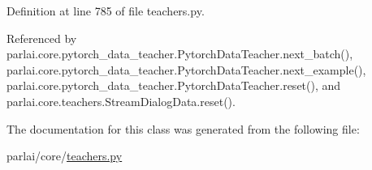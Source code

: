 Definition at line 785 of file teachers.\+py.



Referenced by parlai.\+core.\+pytorch\+\_\+data\+\_\+teacher.\+Pytorch\+Data\+Teacher.\+next\+\_\+batch(), parlai.\+core.\+pytorch\+\_\+data\+\_\+teacher.\+Pytorch\+Data\+Teacher.\+next\+\_\+example(), parlai.\+core.\+pytorch\+\_\+data\+\_\+teacher.\+Pytorch\+Data\+Teacher.\+reset(), and parlai.\+core.\+teachers.\+Stream\+Dialog\+Data.\+reset().



The documentation for this class was generated from the following file\+:\begin{DoxyCompactItemize}
\item 
parlai/core/\hyperlink{teachers_8py}{teachers.\+py}\end{DoxyCompactItemize}
